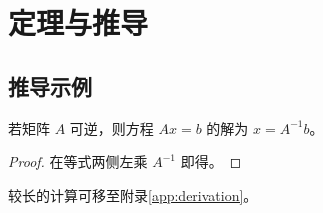 \chapter{定理与推导}
\label{chap:chapter5}

\section{推导示例}
\begin{theorem}
若矩阵 \(A\) 可逆，则方程 \(Ax=b\) 的解为 \(x=A^{-1}b\)。
\end{theorem}
\begin{proof}
在等式两侧左乘 \(A^{-1}\) 即得。
\end{proof}

较长的计算可移至附录\ref{app:derivation}。
